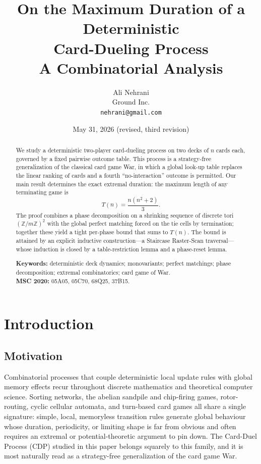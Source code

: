\documentclass[11pt]{article}
\title{On the Maximum Duration of a Deterministic\\ Card-Dueling Process\\[4pt]
\large A Combinatorial Analysis}
\author{Ali Nehrani\\ Ground Inc.\\ \texttt{nehrani@gmail.com}}
\date{May 31, 2026 (revised, third revision)}
\theoremstyle{definition}
\theoremstyle{remark}
\begin{document}
\maketitle

\begin{abstract}
We study a deterministic two-player card-dueling process on two decks of $n$ cards each,
governed by a fixed pairwise outcome table. This process is a strategy-free generalization
of the classical card game War, in which a global look-up table replaces the linear ranking of
cards and a fourth ``no-interaction'' outcome is permitted. Our main result determines
the exact extremal duration: the maximum length of any terminating game is
\[
T(n) = \frac{n(n^2+2)}{3}.
\]
The proof combines a phase decomposition on a shrinking sequence of discrete tori $(\mathbb{Z}/m\mathbb{Z})^2$
with the global perfect matching forced on the tie cells by termination; together these
yield a tight per-phase bound that sums to $T(n)$. The bound is attained by an explicit
inductive construction---a Staircase Raster-Scan traversal---whose induction is closed by a
table-restriction lemma and a phase-reset lemma.

\medskip
\noindent\textbf{Keywords:} deterministic deck dynamics; monovariants; perfect matchings; phase decomposition; extremal combinatorics; card game of War.\\
\noindent\textbf{MSC 2020:} 05A05, 05C70, 68Q25, 37B15.
\end{abstract}

\section{Introduction}

\subsection{Motivation}
Combinatorial processes that couple deterministic local update rules with global memory effects recur throughout discrete mathematics and theoretical computer science. Sorting networks,
the abelian sandpile and chip-firing games, rotor-routing, cyclic cellular automata, and turn-based
card games all share a single signature: simple, local, memoryless transition rules generate global
behaviour whose duration, periodicity, or limiting shape is far from obvious and often requires
an extremal or potential-theoretic argument to pin down. The Card-Duel Process (CDP)
studied in this paper belongs squarely to this family, and it is most naturally read as a strategy-free
generalization of the card game War. 
\end{document}
